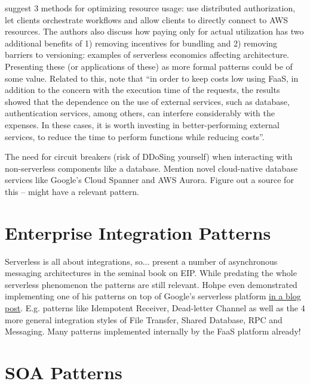 \textcite{adzic2017serverless} suggest 3 methods for optimizing resource usage: use distributed authorization, let clients orchestrate workflows and allow clients to directly connect to AWS resources. The authors also discuss how paying only for actual utilization has two additional benefits of 1) removing incentives for bundling and 2) removing barriers to versioning: examples of serverless economics affecting architecture. Presenting these (or applications of these) as more formal patterns could be of some value. Related to this, \textcite{albuquerque17faaspaas} note that ``in order to keep costs low using FaaS, in addition to the concern with the execution time of the requests, the results showed that the dependence on the use of external services, such as database, authentication services, among others, can interfere considerably with the expenses. In these cases, it is worth investing in better-performing external services, to reduce the time to perform functions while reducing costs''.

The need for circuit breakers (risk of DDoSing yourself) when interacting with non-serverless components like a database. Mention novel cloud-native database services like Google's Cloud Spanner and AWS Aurora. Figure out a source for this -- \textcite{hohpe2004enterprise} might have a relevant pattern.

\section{Enterprise Integration Patterns} \label{sec:enterpriseIntegrationPatterns}

Serverless is all about integrations, so...
\textcite{hohpe2004enterprise} present a number of asynchronous messaging architectures in the seminal book on EIP. While predating the whole serverless phenomenon the patterns are still relevant. Hohpe even demonstrated implementing one of his patterns on top of Google's serverless platform \href{http://www.enterpriseintegrationpatterns.com/ramblings/google_cloud_functions.html}{in a blog post}. E.g. patterns like Idempotent Receiver, Dead-letter Channel as well as the 4 more general integration styles of File Transfer, Shared Database, RPC and Messaging.
Many patterns implemented internally by the FaaS platform already!

\section{SOA Patterns} \label{sec:soaPatterns}

